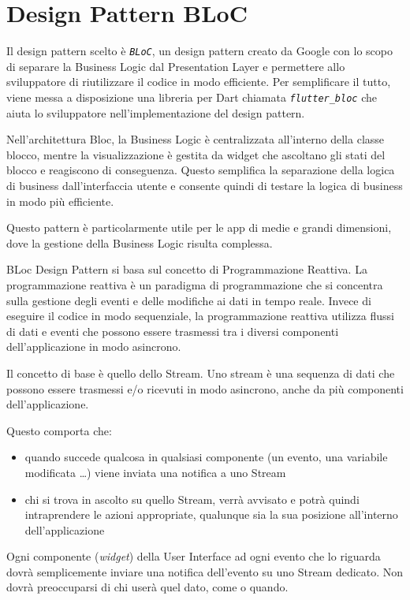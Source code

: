 \documentclass[a4paper, oneside, 12pt]{book}
\begin{document}
\newpage

\section{Design Pattern BLoC}
Il design pattern scelto è \textit{\texttt{BLoC}}, un design pattern creato da Google con lo scopo di separare la Business Logic dal Presentation Layer 
e permettere allo sviluppatore di riutilizzare il codice in modo efficiente. Per semplificare il tutto, viene messa a disposizione una libreria 
per Dart chiamata \textit{\texttt{flutter\_bloc}} che aiuta lo sviluppatore nell'implementazione del design pattern.

Nell'architettura Bloc, la Business Logic è centralizzata all'interno della classe blocco, mentre la visualizzazione è gestita da widget che ascoltano 
gli stati del blocco e reagiscono di conseguenza. Questo semplifica la separazione della logica di business dall'interfaccia utente e consente quindi 
di testare la logica di business in modo più efficiente. 

Questo pattern è particolarmente utile per le app di medie e grandi dimensioni, dove la gestione della Business Logic risulta complessa. 

BLoc Design Pattern si basa sul concetto di Programmazione Reattiva. La programmazione reattiva è un paradigma di programmazione che si concentra 
sulla gestione degli eventi e delle modifiche ai dati in tempo reale. Invece di eseguire il codice in modo sequenziale, la programmazione reattiva 
utilizza flussi di dati e eventi che possono essere trasmessi tra i diversi componenti dell'applicazione in modo asincrono. 

Il concetto di base è quello dello Stream. Uno stream è una sequenza di dati che possono essere trasmessi e/o ricevuti in modo asincrono,
anche da più componenti dell'applicazione.

Questo comporta che:
\begin{itemize}
	\item quando succede qualcosa in qualsiasi componente (un evento, una variabile modificata \ldots) viene inviata una notifica a uno Stream
	\item chi si trova in ascolto su quello Stream, verrà avvisato e potrà quindi intraprendere le azioni appropriate, qualunque sia la sua posizione all'interno dell'applicazione
\end{itemize}

Ogni componente (\textit{widget}) della User Interface ad ogni evento che lo riguarda dovrà semplicemente inviare una notifica dell'evento su uno Stream dedicato. 
Non dovrà preoccuparsi di chi userà quel dato, come o quando.
\end{document}
